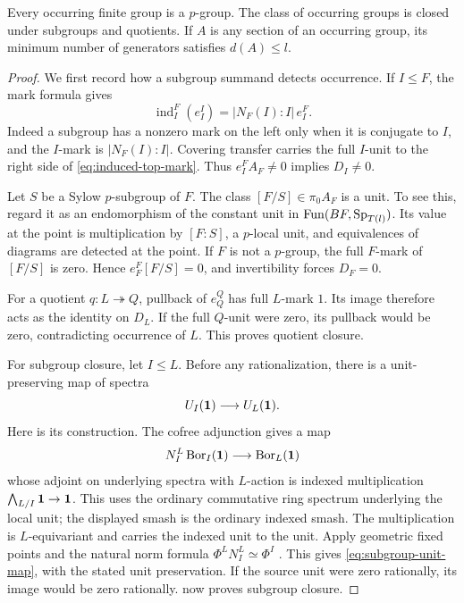 \begin{proposition}\label{prop:occurrence-sections}
Every occurring finite group is a $p$-group.  The class of occurring
groups is closed under subgroups and quotients.  If $A$ is any section
of an occurring group, its minimum number of generators satisfies
$d(A)\le l$.
\end{proposition}
\begin{proof}
We first record how a subgroup summand detects occurrence.  If $I\le F$,
the mark formula gives
\begin{equation}\label{eq:induced-top-mark}
 \operatorname{ind}_I^F(e_I^I)
   =|N_F(I):I|\,e_I^F.
\end{equation}
Indeed a subgroup has a nonzero mark on the left only when it is
conjugate to $I$, and the $I$-mark is $|N_F(I):I|$.
Covering transfer carries the full $I$-unit to the right side of
\eqref{eq:induced-top-mark}.  Thus $e_I^F A_F\ne0$ implies $D_I\ne0$.

Let $S$ be a Sylow $p$-subgroup of $F$.  The class $[F/S]\in\pi_0 A_F$
is a unit.  To see this, regard it as an endomorphism of the constant
unit in $\operatorname{Fun}(BF,\mathrm{Sp}_{T(l)})$.  Its value at the point is multiplication
by $[F:S]$, a $p$-local unit, and equivalences of diagrams are detected
at the point.  If $F$ is not a $p$-group, the full $F$-mark of $[F/S]$
is zero.  Hence $e_F^F[F/S]=0$, and invertibility forces $D_F=0$.

For a quotient $q:L\twoheadrightarrow Q$, pullback of $e_Q^Q$ has full
$L$-mark $1$.  Its image therefore acts as the identity on $D_L$.
If the full $Q$-unit were zero, its pullback would be zero, contradicting
occurrence of $L$.  This proves quotient closure.

For subgroup closure, let $I\le L$.  Before any rationalization, there
is a unit-preserving map of spectra
\begin{equation}\label{eq:subgroup-unit-map}
 U_I(\mathbf1)\longrightarrow U_L(\mathbf1).
\end{equation}
Here is its construction.  The cofree adjunction gives a map
\[
 N_I^L\operatorname{Bor}_I(\mathbf1)\longrightarrow\operatorname{Bor}_L(\mathbf1)
\]
whose adjoint on underlying spectra with $L$-action is indexed
multiplication
$\bigwedge_{L/I}\mathbf1\to\mathbf1$.
This uses the ordinary commutative ring spectrum underlying the local
unit; the displayed smash is the ordinary indexed smash.  The
multiplication is $L$-equivariant and carries the indexed unit to the
unit.  Apply geometric fixed points and the natural norm formula
$\Phi^L N_I^L\simeq\Phi^I$
\cite[Proposition~2.57]{HHR}.  This gives
\eqref{eq:subgroup-unit-map}, with the stated unit preservation.  If the
source unit were zero rationally, its image would be zero rationally.
 now proves subgroup closure.


\end{proof}
